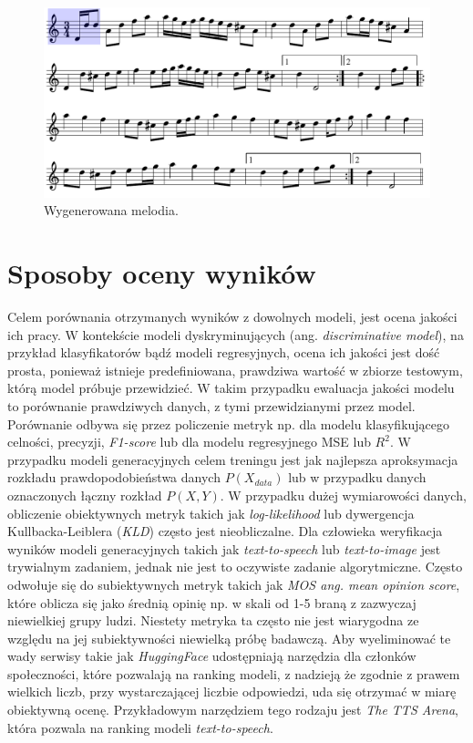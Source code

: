 \documentclass[data-science]{agh-wi} %
\begin{document}
\begin{figure}[ht!]
    \begin{center}
        \includegraphics[width=0.9\linewidth]{./img/abc_gen_nice1.pdf}
    \end{center}
    \caption{Wygenerowana melodia.}\label{fig:music_gen1}
\end{figure}

\section{Sposoby oceny wyników}
Celem porównania otrzymanych wyników z dowolnych modeli, jest ocena jakości ich pracy. W kontekście modeli dyskryminujących (ang. \textit{discriminative model}), na przykład klasyfikatorów bądź modeli regresyjnych, ocena ich jakości jest dość prosta, ponieważ istnieje predefiniowana, prawdziwa wartość w zbiorze testowym, którą model próbuje przewidzieć. W takim przypadku ewaluacja jakości modelu to porównanie prawdziwych danych, z tymi przewidzianymi przez model. Porównanie odbywa się przez policzenie metryk np. dla modelu klasyfikującego celności, precyzji, \textit{F1-score} lub dla modelu regresyjnego MSE lub $R^2$. W przypadku modeli generacyjnych celem treningu jest jak najlepsza aproksymacja rozkładu prawdopodobieństwa danych $P(X_{data})$ lub w przypadku danych oznaczonych łączny rozkład $P(X, Y)$. W przypadku dużej wymiarowości danych, obliczenie obiektywnych metryk takich jak \textit{log-likelihood} lub dywergencja Kullbacka-Leiblera (\textit{KLD}) często jest nieobliczalne. Dla człowieka weryfikacja wyników modeli generacyjnych takich jak \textit{text-to-speech} lub \textit{text-to-image} jest trywialnym zadaniem, jednak nie jest to oczywiste zadanie algorytmiczne. Często odwołuje się do subiektywnych metryk takich jak \textit{MOS ang. mean opinion score}, które oblicza się jako średnią opinię np. w skali od 1-5 braną z zazwyczaj niewielkiej grupy ludzi. Niestety metryka ta często nie jest wiarygodna ze względu na jej subiektywności niewielką próbę badawczą. Aby wyeliminować te wady serwisy takie jak \textit{HuggingFace} udostępniają narzędzia dla członków społeczności, które pozwalają na ranking modeli, z nadzieją że zgodnie z prawem wielkich liczb, przy wystarczającej liczbie odpowiedzi, uda się otrzymać w miarę obiektywną ocenę. Przykładowym narzędziem tego rodzaju jest \textit{The TTS Arena}\cite{tts_arena}, która pozwala na ranking modeli \textit{text-to-speech}.
\end{document}
